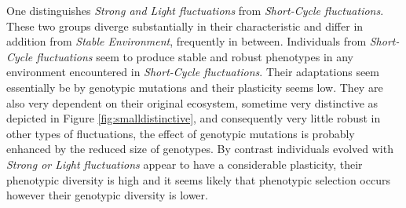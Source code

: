 One distinguishes \emph{Strong and Light fluctuations} from \emph{Short-Cycle fluctuations}. These two groups diverge substantially in their characteristic and differ in addition from \emph{Stable Environment}, frequently in between. Individuals from \emph{Short-Cycle fluctuations} seem to produce stable and robust phenotypes in any environment encountered in \emph{Short-Cycle fluctuations}. Their adaptations seem essentially be by genotypic mutations and their plasticity seems low. They are also very dependent on their original ecosystem, sometime very distinctive as depicted in Figure \ref{fig:smalldistinctive}, and consequently very little robust in other types of fluctuations, the effect of genotypic mutations is probably enhanced by the reduced size of genotypes. By contrast individuals evolved with \emph{Strong or Light fluctuations} appear to have a considerable plasticity, their phenotypic diversity is high and it seems likely that phenotypic selection occurs however their genotypic diversity is lower.

